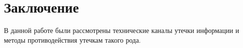 \section*{Заключение}

В данной работе были рассмотрены технические каналы утечки информации и методы противодействия утечкам такого рода.